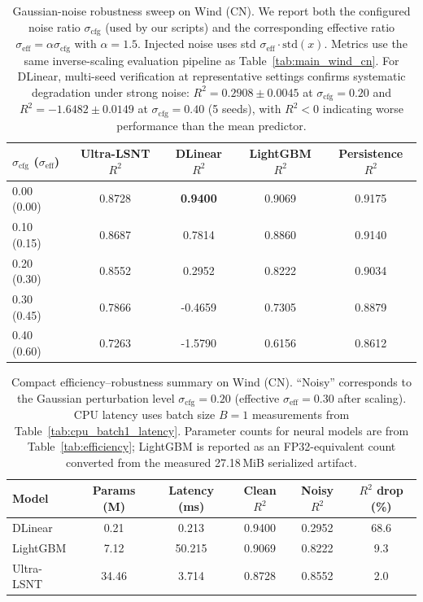 \documentclass[review,3p,times]{elsarticle}
\begin{document}
\begin{table}[t]
\centering
\caption{Gaussian-noise robustness sweep on Wind (CN). We report both the configured noise ratio $\sigma_{\mathrm{cfg}}$ (used by our scripts) and the corresponding effective ratio $\sigma_{\mathrm{eff}}=\alpha\sigma_{\mathrm{cfg}}$ with $\alpha=1.5$. Injected noise uses std $\sigma_{\mathrm{eff}}\cdot\mathrm{std}(x)$. Metrics use the same inverse-scaling evaluation pipeline as Table~\ref{tab:main_wind_cn}. For DLinear, multi-seed verification at representative settings confirms systematic degradation under strong noise: $R^2=0.2908\pm0.0045$ at $\sigma_{\text{cfg}}=0.20$ and $R^2=-1.6482\pm0.0149$ at $\sigma_{\text{cfg}}=0.40$ (5 seeds), with $R^2<0$ indicating worse performance than the mean predictor.}
\label{tab:robust_gaussian_sweep}
\begin{tabular}{lcccc}
\toprule
$\sigma_{\mathrm{cfg}}$ ($\sigma_{\mathrm{eff}}$) & Ultra-LSNT $R^2$ & DLinear $R^2$ & LightGBM $R^2$ & Persistence $R^2$ \\
\midrule
0.00 (0.00) & 0.8728 & \textbf{0.9400} & 0.9069  & 0.9175 \\
0.10 (0.15) & 0.8687 & 0.7814 & 0.8860  & 0.9140 \\
0.20 (0.30) & 0.8552 & 0.2952 & 0.8222  & 0.9034 \\
0.30 (0.45) & 0.7866 & -0.4659 & 0.7305  & 0.8879 \\
0.40 (0.60) & 0.7263 & -1.5790 & 0.6156  & 0.8612 \\
\bottomrule
\end{tabular}
\end{table}

\begin{table}[t]
\centering
\caption{Compact efficiency--robustness summary on Wind (CN). ``Noisy'' corresponds to the Gaussian perturbation level $\sigma_{\mathrm{cfg}}=0.20$ (effective $\sigma_{\mathrm{eff}}=0.30$ after scaling). CPU latency uses batch size $B=1$ measurements from Table~\ref{tab:cpu_batch1_latency}. Parameter counts for neural models are from Table~\ref{tab:efficiency}; LightGBM is reported as an FP32-equivalent count converted from the measured 27.18\,MiB serialized artifact.}
\label{tab:eff_robust_tradeoff}
\scriptsize
\begin{tabular}{lccccc}
\toprule
Model & Params (M) & Latency (ms) & Clean $R^2$ & Noisy $R^2$ & $R^2$ drop (\%) \\
\midrule
DLinear & 0.21 & 0.213 & 0.9400 & 0.2952 & 68.6 \\
LightGBM & 7.12 & 50.215 & 0.9069 & 0.8222 & 9.3 \\
Ultra-LSNT & 34.46 & 3.714 & 0.8728 & 0.8552 & 2.0 \\
\bottomrule
\end{tabular}
\end{table}
\end{document}
